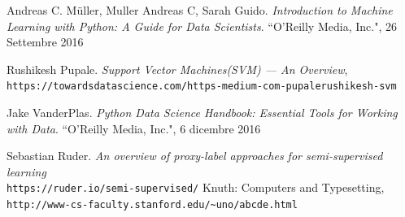 \documentclass[12pt,italian]{report}
\begin{document}
\begin{thebibliography}{9}
	Andreas C. Müller, Muller Andreas C, Sarah Guido. 
	\textit{Introduction to Machine Learning with Python: A Guide for Data Scientists}. 
	``O'Reilly Media, Inc.", 26 Settembre 2016
	
 	Rushikesh Pupale. \textit{Support Vector Machines(SVM) — An Overview}, \\\texttt{https://towardsdatascience.com/https-medium-com-pupalerushikesh-svm}
 	
 	Jake VanderPlas. 
 	\textit{Python Data Science Handbook: Essential Tools for Working with Data}. 
 	``O'Reilly Media, Inc.", 6 dicembre 2016

 	Sebastian Ruder. \textit{An overview of proxy-label approaches for semi-supervised learning}
 	\\\texttt{https://ruder.io/semi-supervised/}
	Knuth: Computers and Typesetting,
	\\\texttt{http://www-cs-faculty.stanford.edu/\~{}uno/abcde.html}
\end{thebibliography}
\end{document}
